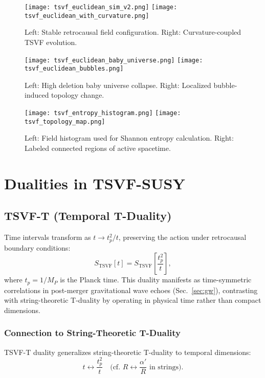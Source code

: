 \documentclass[twocolumn,superscriptaddress,floatfix]{revtex4-2}
\begin{document}
\begin{figure}[h]
    \centering
    \texttt{[image: tsvf\_euclidean\_sim\_v2.png]}
    \texttt{[image: tsvf\_euclidean\_with\_curvature.png]}
    \caption{Left: Stable retrocausal field configuration. Right: Curvature-coupled TSVF evolution.}
    \label{fig:retrocausal_basic_curved}
\end{figure}

\begin{figure}[h]
    \centering
    \texttt{[image: tsvf\_euclidean\_baby\_universe.png]}
    \texttt{[image: tsvf\_euclidean\_bubbles.png]}
    \caption{Left: High deletion baby universe collapse. Right: Localized bubble-induced topology change.}
    \label{fig:retrocausal_topology_changes}
\end{figure}

\begin{figure}[h]
    \centering
    \texttt{[image: tsvf\_entropy\_histogram.png]}
    \texttt{[image: tsvf\_topology\_map.png]}
    \caption{Left: Field histogram used for Shannon entropy calculation. Right: Labeled connected regions of active spacetime.}
    \label{fig:entropy_and_topo_labels}
\end{figure}


\section{Dualities in TSVF-SUSY}  
\label{sec:dualities}  

\subsection{TSVF-T (Temporal T-Duality)}  
\label{subsec:t_duality}  

Time intervals transform as \( t \to t_p^2 / t \), preserving the action under retrocausal boundary conditions:  
\begin{equation}  
S_{\text{TSVF}}[t] = S_{\text{TSVF}}\!\left[\frac{t_p^2}{t}\right],  
\label{eq:t_duality}  
\end{equation}  
where \( t_p = 1/M_P \) is the Planck time. This duality manifests as time-symmetric correlations in post-merger gravitational wave echoes (Sec.~\ref{sec:gw}), contrasting with string-theoretic T-duality \cite{Polchinski1998} by operating in physical time rather than compact dimensions.  

\subsubsection{Connection to String-Theoretic T-Duality}  
TSVF-T duality generalizes string-theoretic T-duality \cite{Polchinski1998} to temporal dimensions:  
\begin{equation}  
t \leftrightarrow \frac{t_p^2}{t} \quad \text{(cf. } R \leftrightarrow \frac{\alpha'}{R} \text{ in strings)}.  
\end{equation}  
\end{document}
